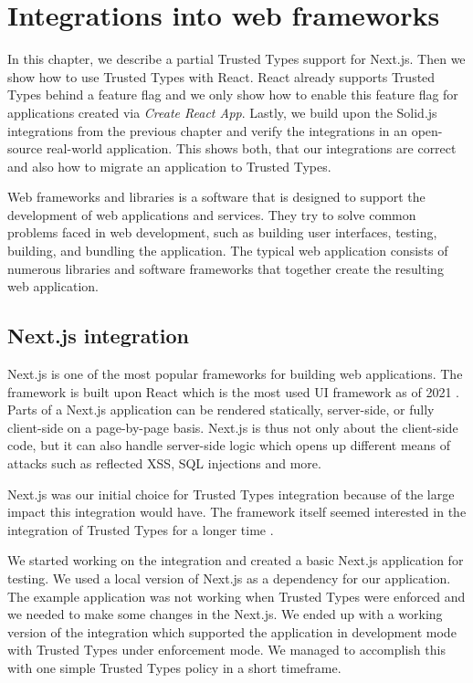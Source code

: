 \chapter{Integrations into web frameworks}

In this chapter, we describe a partial Trusted Types support for Next.js. Then we show how to use
Trusted Types with React. React already supports Trusted Types behind a feature flag and we only
show how to enable this feature flag for applications created via \emph{Create React App}. Lastly,
we build upon the Solid.js integrations from the previous chapter and verify the integrations in an
open-source real-world application. This shows both, that our integrations are correct and also how
to migrate an application to Trusted Types.

Web frameworks and libraries is a software that is designed to support the development of web
applications and services. They try to solve common problems faced in web development, such as
building user interfaces, testing, building, and bundling the application. The typical web
application consists of numerous libraries and software frameworks that together create the
resulting web application.

\section{Next.js integration}
\label{intro-nextjs}

Next.js is one of the most popular frameworks for building web applications. The framework is built
upon React which is the most used UI framework as of 2021 \cite{react_most_used_2021}. Parts of a
Next.js application can be rendered statically, server-side, or fully client-side on a page-by-page
basis. Next.js is thus not only about the client-side code, but it can also handle server-side logic
which opens up different means of attacks such as reflected XSS, SQL injections and more.

Next.js was our initial choice for Trusted Types integration because of the large impact this
integration would have. The framework itself seemed interested in the integration of Trusted Types
for a longer time \cite{nextjs_tt_pr_2020}.

We started working on the integration and created a basic Next.js application for testing. We used a
local version of Next.js as a dependency for our application. The example application was not
working when Trusted Types were enforced and we needed to make some changes in the Next.js. We ended
up with a working version of the integration which supported the application in development mode
with Trusted Types under enforcement mode. We managed to accomplish this with one simple Trusted
Types policy in a short timeframe.

